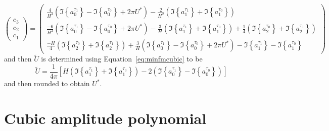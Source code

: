 \[
    \begin{pmatrix}
        c_{3} \\
        c_{2} \\
        c_{1}
    \end{pmatrix}
    =
    \begin{pmatrix}
        \frac{4}{H^3} \left( \Im \left\{ a^{\tau_1}_0 \right\}
            - \Im \left\{ a^{\tau_0}_0 \right\} + 2 \pi U^{\ast} \right)
        - \frac{2}{H^{2}} \left( \Im \left\{ a^{\tau_1}_1 \right\}
            + \Im \left\{ a^{\tau_0}_1 \right\} \right) \\
        \frac{-6}{H^2} \left( \Im \left\{ a^{\tau_1}_0 \right\}
            - \Im \left\{ a^{\tau_0}_0 \right\} + 2 \pi U^{\ast} \right)
        - \frac{3}{H} \left( \Im \left\{ a^{\tau_1}_1 \right\}
            + \Im \left\{ a^{\tau_0}_1 \right\} \right)
        + \frac{1}{4}  \left( \Im \left\{ a^{\tau_0}_{2} \right\} + \Im \left\{
            a^{\tau_1}_{2} \right\} \right) \\
        \frac{-H}{4}  \left( \Im \left\{ a^{\tau_0}_{2} \right\} + \Im \left\{
            a^{\tau_1}_{2} \right\} \right) 
        + \frac{3}{H} \left( \Im \left\{ a^{\tau_1}_0 \right\}
            - \Im \left\{ a^{\tau_0}_0 \right\} + 2 \pi U^{\ast} \right)
        -  \Im \left\{ a^{\tau_1}_1 \right\}
            - \Im \left\{ a^{\tau_0}_1 \right\}
    \end{pmatrix}
\]
and then $\tilde{U}$ is determined using Equation~\ref{eq:minfmcubic} to be
\[
    \tilde{U} = \frac{1}{4 \pi} \left[ H \left( \Im \left\{ a^{\tau_1}_1
            \right\} + \Im \left\{
        a^{\tau_0}_1 \right\} \right)
        -2 \left( \Im \left\{ a^{\tau_1}_0 \right\} - \Im \left\{
        a^{\tau_0}_0 \right\} \right) \right]
\]
and then rounded to obtain $U^{\ast}$.

\section{Cubic amplitude polynomial \label{sec:cubicamppoly}}

